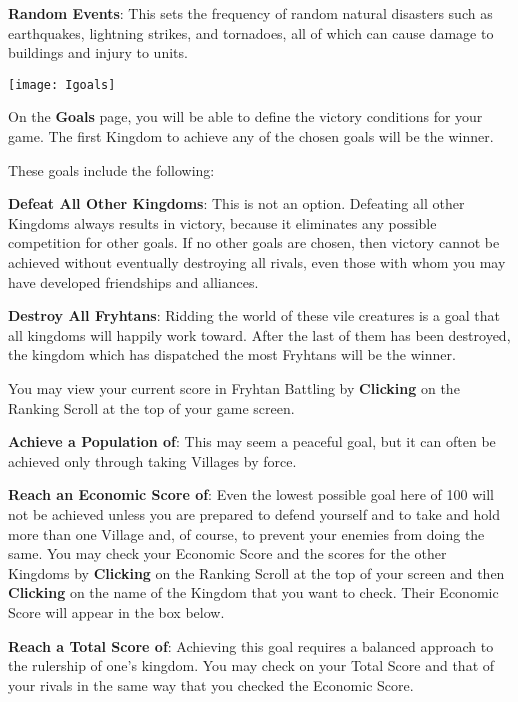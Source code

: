 \textbf{Random Events}: This sets the frequency of random natural disasters such as earthquakes, lightning strikes, and tornadoes, all of which can cause damage to buildings and injury to units.


\begin{center}
	\texttt{[image: Igoals]} %
\end{center}

On the \textbf{Goals} page, you will be able to define the victory conditions for your game. The first Kingdom to achieve any of the chosen goals will be the winner.

These goals include the following:

\textbf{Defeat All Other Kingdoms}: This is not an option. Defeating all other Kingdoms always results in victory, because it eliminates any possible competition for other goals. If no other goals are chosen, then victory cannot be achieved without eventually destroying all rivals, even those with whom you may have developed friendships and alliances.

\textbf{Destroy All Fryhtans}: Ridding the world of these vile creatures is a goal that all kingdoms will happily work toward. After the last of them has been destroyed, the kingdom which has dispatched the most Fryhtans will be the winner.

You may view your current score in Fryhtan Battling by \textbf{Clicking} on the Ranking Scroll at the top of your game screen.

\textbf{Achieve a Population of}: This may seem a peaceful goal, but it can often be achieved only through taking Villages by force.

\textbf{Reach an Economic Score of}: Even the lowest possible goal here of 100 will not be achieved unless you are prepared to defend yourself and to take and hold more than one Village and, of course, to prevent your enemies from doing the same. You may check your Economic Score and the scores for the other Kingdoms by \textbf{Clicking} on the Ranking Scroll at the top of your screen and then \textbf{Clicking} on the name of the Kingdom that you want to check. Their Economic Score will appear in the box below.

\textbf{Reach a Total Score of}: Achieving this goal requires a balanced approach to the rulership of one’s kingdom. You may check on your Total Score and that of your rivals in the same way that you checked the Economic Score.


